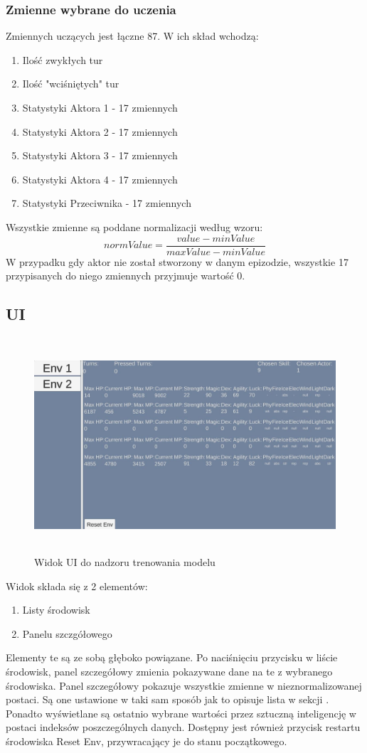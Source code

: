 \documentclass{SGGW-thesis}
\begin{document}
\subsubsection{Zmienne wybrane do uczenia}
\label{zmienne}
Zmiennych uczących jest łączne 87. W ich skład wchodzą:
\begin{enumerate}
  \item{Ilość zwykłych tur}
  \item{Ilość "wciśniętych" tur}
  \item{Statystyki Aktora 1 - 17 zmiennych}
  \item{Statystyki Aktora 2 - 17 zmiennych}
  \item{Statystyki Aktora 3 - 17 zmiennych}
  \item{Statystyki Aktora 4 - 17 zmiennych}
  \item{Statystyki Przeciwnika - 17 zmiennych}
\end{enumerate}
Wszystkie zmienne są poddane normalizacji według wzoru:
\[normValue = \frac{value-minValue}{maxValue-minValue}\]
W przypadku gdy aktor nie został stworzony w danym epizodzie, wszystkie 17 przypisanych do niego zmiennych przyjmuje wartość 0.
\subsection{UI}
\begin{figure}[H]
  \centering
  \includegraphics[height=8cm]{trainingui.JPG}
  \caption{Widok UI do nadzoru trenowania modelu}
\end{figure}
\pagebreak
Widok składa się z 2 elementów:
\begin{enumerate}
  \item{Listy środowisk}
  \item{Panelu szczgółowego}
\end{enumerate}
Elementy te są ze sobą głęboko powiązane. Po naciśnięciu przycisku w liście środowisk, panel szczegółowy zmienia pokazywane dane na te z wybranego środowiska.
Panel szczegółowy pokazuje wszystkie zmienne w nieznormalizowanej postaci. Są one ustawione w taki sam sposób jak to opisuje lista w sekcji .
Ponadto wyświetlane są ostatnio wybrane wartości przez sztuczną inteligencję w postaci indeksów poszczególnych danych. Dostępny jest również przycisk restartu
środowiska Reset Env, przywracający je do stanu początkowego.
\end{document}

